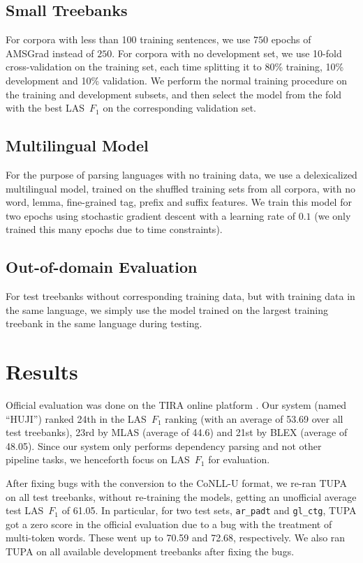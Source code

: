 \documentclass[11pt,a4paper]{article}
\begin{document}
\subsection{Small Treebanks}

For corpora with less than 100 training sentences,
we use $750$ epochs of AMSGrad instead of $250$.
For corpora with no development set,
we use 10-fold cross-validation on the training set,
each time splitting it to 80\% training, 10\% development and 10\% validation.
We perform the normal training procedure on the training and development
subsets, and then select the model from the fold with the best LAS~$F_1$
on the corresponding validation set.

\subsection{Multilingual Model}

For the purpose of parsing languages with no training data,
we use a delexicalized multilingual model, trained on the shuffled training sets
from all corpora, with no word, lemma, fine-grained tag, prefix and suffix features.
We train this model for two epochs using stochastic gradient descent
with a learning rate of $0.1$
(we only trained this many epochs due to time constraints).

\subsection{Out-of-domain Evaluation}

For test treebanks without corresponding training data,
but with training data in the same language,
we simply use the model trained on the largest training treebank in the same language
during testing.


\section{Results}\label{sec:results}

Official evaluation was done on the TIRA online platform \cite{tira}.
Our system (named ``HUJI'') ranked 24th in the LAS~$F_1$ ranking
(with an average of 53.69 over all test treebanks),
23rd by MLAS (average of 44.6) and 21st by BLEX (average of 48.05).
Since our system only performs dependency parsing and not other pipeline tasks,
we henceforth focus on LAS~$F_1$ \cite{nivre17udw} for evaluation.

After fixing bugs with the conversion to the CoNLL-U format,
we re-ran TUPA on all test treebanks, without re-training the models,
getting an unofficial average test LAS~$F_1$ of 61.05.
In particular, for two test sets, \verb|ar_padt| and \verb|gl_ctg|, TUPA got
a zero score in the official evaluation due to a bug with the treatment of multi-token words.
These went up to 70.59 and 72.68, respectively.
We also ran TUPA on all available development treebanks after fixing the bugs.
\end{document}
